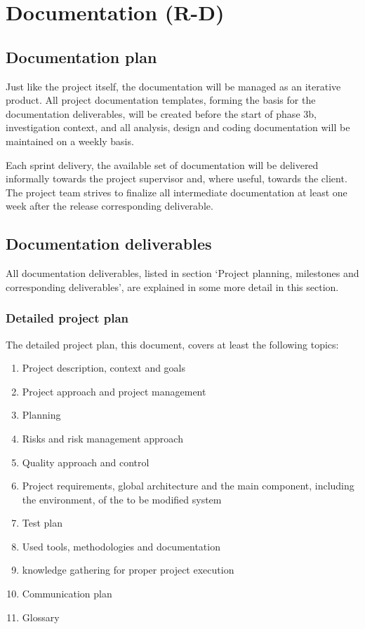 
\section{Documentation (R-D)}
\label{sec:documentation}
\subsection{Documentation plan}
Just like the project itself, the documentation will be managed as an iterative product.
All project documentation templates, forming the basis for the documentation deliverables, will be created before the start of phase 3b, investigation context, and all analysis, design and coding documentation will be maintained on a weekly basis.

Each sprint delivery, the available set of documentation will be delivered informally towards the project supervisor and, where useful, towards the client.
The project team strives to finalize all intermediate documentation at least one week after the release corresponding deliverable.

\subsection{Documentation deliverables}
All documentation deliverables, listed in section `Project planning, milestones and corresponding deliverables', are explained in some more detail in this section.

\subsubsection{Detailed project plan}
The detailed project plan, this document, covers at least the following topics:

	\begin{enumerate}
		\item Project description, context and goals
		\item Project approach and project management
		\item Planning
		\item Risks and risk management approach
		\item Quality approach and control
		\item Project requirements, global architecture and the main component, including the environment, of the to be modified system
		\item Test plan
		\item Used tools, methodologies and documentation
		\item knowledge gathering for proper project execution
		\item Communication plan
		\item Glossary
	\end {enumerate}

